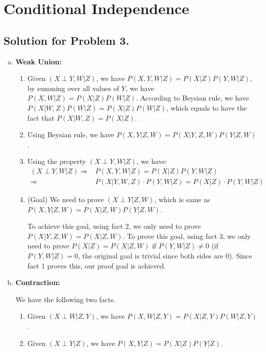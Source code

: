 \documentclass[notitlepage]{article}
\begin{document}
\section{Conditional Independence}
\subsection*{Solution for Problem 3.}
\begin{enumerate}[(a)] %
\item {\bf Weak Union:} 

\begin{enumerate}[1.]
\item Given $(X\perp Y,W | Z)$, we have $P(X,Y,W|Z) = P(X|Z)P(Y,W|Z)$, by summing over all values of $Y$, we have $P(X,W|Z) = P(X|Z)P(W|Z)$. According to Beysian rule, we have $P(X|W,Z)P(W|Z)=P(X|Z)P(W|Z)$, which equals to have the fact that $P(X|W,Z)=P(X|Z)$.

\item Using Beysian rule, we have $P(X,Y|Z,W) = P(X| Y, Z, W)P(Y|Z,W)$.

\item Using the property $(X\perp Y,W | Z)$, we have:
\begin{align*}
(X\perp Y,W | Z) \Longrightarrow & P(X,Y,W|Z) = P(X|Z)P(Y,W|Z)\\
\Longrightarrow & P(X|Y,W,Z)\cdot P(Y,W|Z) = P(X|Z)\cdot P(Y,W|Z)
\end{align*}
\item (Goal) We need to prove $(X\perp Y|Z,W)$, which is same as $P(X,Y|Z,W)=P(X|Z,W)P(Y|Z,W)$.

To achieve this goal, using fact 2, we only need to prove $P(X|Y,Z,W)=P(X|Z,W)$. To prove this goal, using fact 3, we only need to prove $P(X|Z)=P(X|Z,W)$ if $P(Y,W|Z)\neq 0$ (if $P(Y,W|Z)=0$, the original goal is trivial since both sides are 0). Since fact 1 proves this, our proof goal is achieved.
\end{enumerate}


\item {\bf Contraction:}  

We have the following two facts.
\begin{enumerate}[1.]
\item Given $(X\perp W |Z,Y)$, we have $P(X,W|Z,Y)=P(X|Z,Y)P(W|Z,Y)$.
\item Given $(X\perp Y | Z)$, we have $P(X,Y|Z)=P(X|Z)P(Y|Z)$.
\end{enumerate}


\end{enumerate}
\end{document}
